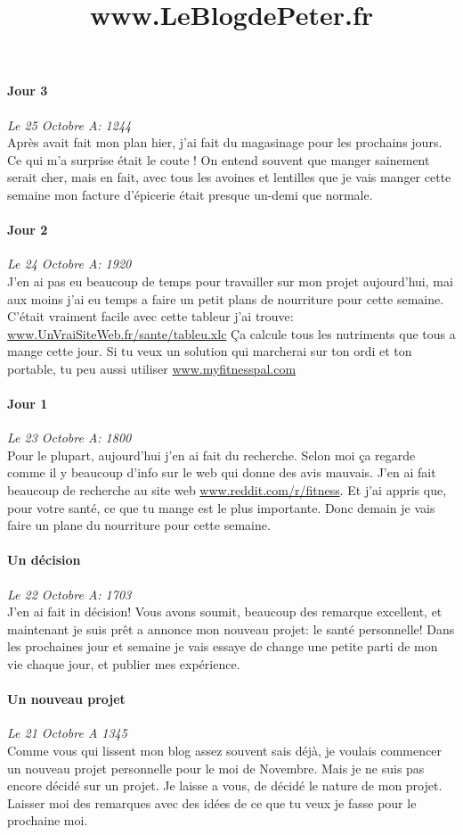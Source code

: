 \documentclass{article}
\begin{document}
\title{www.LeBlogdePeter.fr}


\paragraph{Jour 3} \emph{Le 25 Octobre A: 1244}\\
Après avait fait mon plan hier, j'ai fait du magasinage pour les prochains jours. Ce qui m'a surprise était le coute ! On entend souvent que manger sainement serait cher, mais en fait, avec tous les avoines et lentilles que je vais manger cette semaine mon facture d'épicerie était presque un-demi que normale.

\paragraph{Jour 2} \emph{Le 24 Octobre A: 1920}\\
J'en ai pas eu beaucoup de temps pour travailler sur mon projet aujourd'hui, mai aux moins j'ai eu temps a faire un petit plans de nourriture
pour cette semaine. C'était vraiment facile avec cette tableur j'ai trouve: \underline{www.UnVraiSiteWeb.fr/sante/tableu.xlc} Ça calcule 
tous les nutriments que tous a mange cette jour. Si tu veux un solution qui marcherai sur ton ordi et ton portable, tu peu aussi utiliser 
\underline{www.myfitnesspal.com}

\paragraph{Jour 1} \emph{Le 23 Octobre A: 1800}\\
Pour le plupart, aujourd'hui j'en ai fait du recherche. Selon moi ça regarde comme il y beaucoup d'info sur le web qui donne des avis mauvais.
J'en ai fait beaucoup de recherche au site web \underline{www.reddit.com/r/fitness}. Et j'ai appris que, pour votre santé, ce que tu mange est
le plus importante. Donc demain je vais faire un plane du nourriture pour cette semaine.

\paragraph{Un décision} \emph{Le 22 Octobre A: 1703}\\
J'en ai fait in décision!  Vous avons soumit, beaucoup des remarque excellent, et maintenant je suis prêt a annonce mon nouveau projet: le santé personnelle! Dans les prochaines jour et semaine je vais essaye de change une petite parti de mon vie chaque jour, et publier mes expérience.

\paragraph{Un nouveau projet} \emph{Le 21 Octobre A 1345} \\
Comme vous qui lissent mon blog assez souvent sais déjà, je voulais commencer un nouveau projet personnelle pour le moi de Novembre. Mais je ne suis pas encore décidé sur un projet. Je laisse a vous, de décidé le nature de mon projet. Laisser moi des remarques avec des idées de ce que tu veux je fasse pour le prochaine moi.
\end{document}
